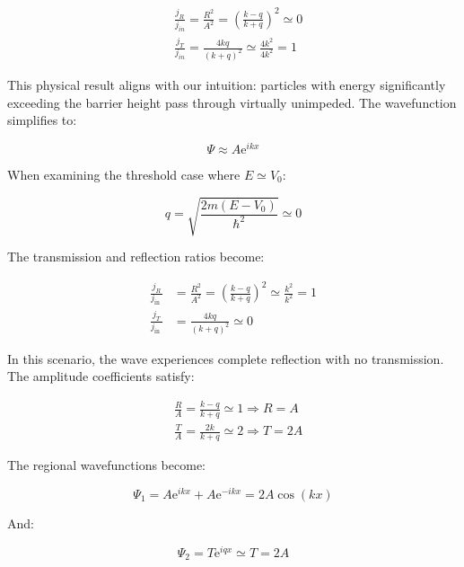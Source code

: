 \documentclass[italian]{HKNdocument}
\begin{document}
\begin{align}
& \frac{j_{R}}{j_{i n}}=\frac{R^{2}}{A^{2}}=\left(\frac{k-q}{k+q}\right)^{2} \simeq 0  \label{eq:6.30}\\
& \frac{j_{T}}{j_{i n}}=\frac{4 k q}{(k+q)^{2}} \simeq \frac{4 k^{2}}{4 k^{2}}=1
\end{align}

This physical result aligns with our intuition: particles with energy significantly exceeding the barrier height pass through virtually unimpeded. The wavefunction simplifies to:

\begin{equation}
\Psi \approx A \mathrm{e}^{i k x} \label{eq:6.31}
\end{equation}

When examining the threshold case where $E \simeq V_{0}$:

\begin{equation}
q=\sqrt{\frac{2 m\left(E-V_{0}\right)}{\hbar^{2}}} \simeq 0 \label{eq:6.32}
\end{equation}

The transmission and reflection ratios become:

\begin{align}
\frac{j_{R}}{j_{\text {in }}} & =\frac{R^{2}}{A^{2}}=\left(\frac{k-q}{k+q}\right)^{2} \simeq \frac{k^{2}}{k^{2}}=1  \label{eq:6.33}\\
\frac{j_{T}}{j_{\text {in }}} & =\frac{4 k q}{(k+q)^{2}} \simeq 0
\end{align}

In this scenario, the wave experiences complete reflection with no transmission. The amplitude coefficients satisfy:

\begin{align}
& \frac{R}{A}=\frac{k-q}{k+q} \simeq 1 \Longrightarrow R=A  \label{eq:6.34}\\
& \frac{T}{A}=\frac{2 k}{k+q} \simeq 2 \Longrightarrow T=2 A
\end{align}

The regional wavefunctions become:

\begin{equation}
\Psi_{1}=A \mathrm{e}^{i k x}+A \mathrm{e}^{-i k x}=2 A \cos (k x) \label{eq:6.35}
\end{equation}

And:

\begin{equation}
\Psi_{2}=T \mathrm{e}^{i q x} \simeq T=2 A \label{eq:6.36}
\end{equation}
\end{document}
